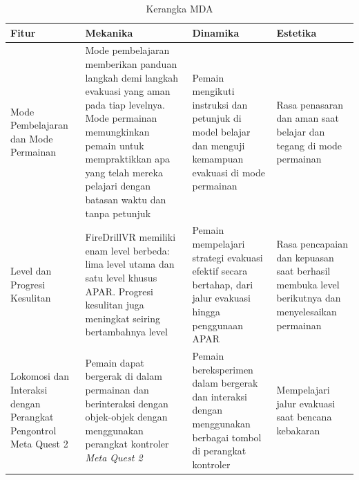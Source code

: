 \begin{table}[h!]
\centering
\caption{Kerangka MDA}
\begin{tabular}{|p{3cm}|p{5cm}|p{3cm}|p{3cm}|}
\hline
\textbf{Fitur} & \textbf{Mekanika} & \textbf{Dinamika} & \textbf{Estetika} \\ \hline
 Mode Pembelajaran dan Mode Permainan & Mode pembelajaran memberikan panduan langkah demi langkah evakuasi yang aman pada tiap levelnya. Mode permainan memungkinkan pemain untuk mempraktikkan apa yang telah mereka pelajari dengan batasan waktu dan tanpa petunjuk & Pemain mengikuti instruksi dan petunjuk di model belajar dan menguji kemampuan evakuasi di mode permainan  & Rasa penasaran dan aman saat belajar dan tegang di mode permainan  \\ \hline
 Level dan Progresi Kesulitan & FireDrillVR memiliki enam level berbeda: lima level utama dan satu level khusus APAR. Progresi kesulitan juga meningkat seiring bertambahnya level & Pemain mempelajari strategi evakuasi efektif secara bertahap, dari jalur evakuasi hingga penggunaan APAR & Rasa pencapaian dan kepuasan saat berhasil membuka level berikutnya dan menyelesaikan permainan \\ \hline
 Lokomosi dan Interaksi dengan Perangkat Pengontrol Meta Quest 2 & Pemain dapat bergerak di dalam permainan dan berinteraksi dengan objek-objek dengan menggunakan perangkat kontroler \textit{Meta Quest 2} & Pemain bereksperimen dalam bergerak dan interaksi dengan menggunakan berbagai tombol di perangkat kontroler & Mempelajari jalur evakuasi saat bencana kebakaran \\ \hline

\end{tabular}

\label{tab:kerangka-mda}
\end{table}

